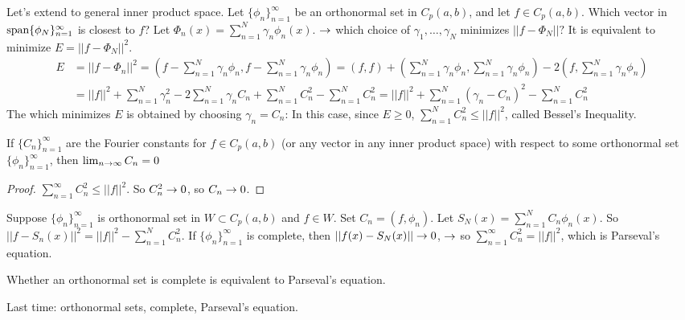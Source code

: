 \documentclass[]{article}
\begin{document}
Let's extend to general inner product space. Let $\{\phi_n\}_{n=1}^\infty$ be an orthonormal set in $C_p(a,b)$, and let $f\in C_p(a,b)$. Which vector in $\text{span}\{\phi_N\}_{n=1}^\infty$ is closest to $f$?
Let $\Phi_n (x) = \sum_{n=1}^N \gamma_n \phi_n(x)$. $\rightarrow$ which choice of $\gamma_1,\dots,\gamma_N$ minimizes $||f-\Phi_N||?$ It is equivalent to minimize $E = ||f-\Phi_N||^2$.
\begin{align*}
E &= ||f-\Phi_n||^2 = \left(f - \sum_{n=1}^N \gamma_n \phi_n, f-\sum_{n=1}^N \gamma_n \phi_n \right) = (f,f) + \left(\sum_{n=1}^N \gamma_n \phi_n, \sum_{n=1}^N \gamma_n \phi_n \right) - 2\left( f, \sum_{n=1}^N \gamma_n \phi_n \right) \\
&= ||f||^2 + \sum_{n=1}^N \gamma_n^2 - 2\sum_{n=1}^N \gamma_n C_n + \sum_{n=1}^N C_n^2 - \sum_{n=1}^N C_n^2 = ||f||^2 + \sum_{n=1}^N(\gamma_n - C_n)^2 - \sum_{n=1}^N C_n^2
\end{align*}
The  which minimizes $E$ is obtained by choosing $\gamma_n = C_n$: In this case, since $E\geq 0$, $\sum_{n=1}^N C_n^2 \leq ||f||^2$, called Bessel's Inequality.
\begin{theorem}
	If $\{C_n\}_{n=1}^\infty$ are the Fourier constants for $f\in C_p(a,b)$ (or any vector in any inner product space) with respect to some orthonormal set $\{\phi_n\}_{n=1}^\infty$, then $\lim_{n\rightarrow\infty} C_n = 0$
\end{theorem}
\begin{proof}
	$\sum_{n=1}^\infty C_n^2 \leq ||f||^2$. So $C_n^2\rightarrow 0$, so $C_n\rightarrow 0$.
\end{proof}
Suppose $\{\phi_n\}_{n=1}^\infty$ is orthonormal set in $W\subset C_p(a,b)$ and $f\in W$. Set $C_n = (f,\phi_n)$. Let $S_N(x) = \sum_{n=1}^N C_n\phi_n(x)$. So $||f-S_n(x)||^2 = ||f||^2 - \sum_{n=1}^N C_n^2$. If $\{\phi_n\}_{n=1}^\infty$ is complete, then $||f(x)-S_N(x)|| \rightarrow 0$, $\rightarrow$ so $\sum_{n=1}^\infty C_n^2 = ||f||^2$, which is Parseval's equation.
\begin{remark}
	Whether an orthonormal set is complete is equivalent to Parseval's equation.
\end{remark}

Last time: orthonormal sets, complete, Parseval's equation.
\end{document}
